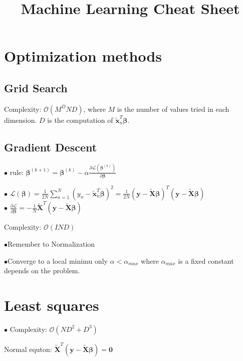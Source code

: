 \documentclass[10pt,a4paper,landscape]{article}
\renewcommand{\bf}[1]{\ensuremath{\mathbf{#1}}}
\newcommand{\bbeta}{\boldsymbol\beta}
\begin{document}
\small
\title{Machine Learning Cheat Sheet}

\raggedright
\footnotesize
\sffamily
\begin{multicols*}{6}

\setlength{\premulticols}{0pt}
\setlength{\postmulticols}{0pt}
\setlength{\multicolsep}{0pt}
\setlength{\columnsep}{0pt}

\section{Optimization methods}



\subsection{Grid Search}
Complexity: $\mathcal{O}(M^D N D)$, where $M$ is the number of values tried in each dimension. $D$ is the computation of $\tilde{\bf{x}}_n^T\bbeta$.

\subsection{Gradient Descent}
$\bullet$ rule: $\bbeta^{(k+1)} = \bbeta^{(k)} - \alpha \frac{\partial \mathcal{L}(\bbeta^{(k)})}{\partial \bbeta}$

$\bullet$ $\mathcal{L}(\bbeta) = \frac{1}{2N}\sum_{n=1}^N(y_n-\tilde{\bf{x}}_n^T\bbeta)^2=\frac{1}{2N}(\bf{y}-\tilde{\bf{X}}\bbeta)^T(\bf{y}-\tilde{\bf{X}}\bbeta)$\\
$\bullet$ $\frac{\partial \mathcal{L}}{\partial \bbeta} = - \frac{1}{N} \tilde{\bf{X}}^T ( \boldsymbol y - \tilde{\bf{X}} \bbeta )$

Complexity: $\mathcal{O}(I N D)$

$\bullet$Remember to Normalization

$\bullet$Converge to a local minimu only $\alpha<\alpha_{max}$ where $\alpha_{max}$ is a fixed constant depends on the problem.

\section{Least squares}
$\bullet$ Complexity: $\mathcal{O}(ND^2 + D^3)$

Normal equton:
$\tilde{\bf{X}}^T ( \boldsymbol y - \tilde{\bf{X}} \bbeta )= \bf{0}$



\end{multicols*}
\end{document}

